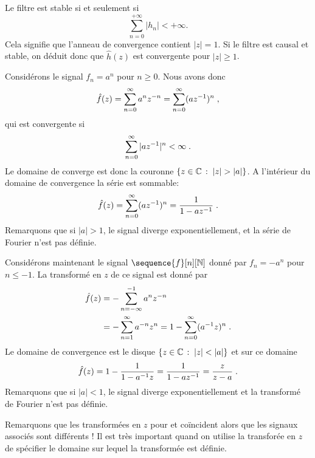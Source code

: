 Le filtre est stable si et seulement si
\[
\sum_{n=0}^{+\infty} |h_n| < +\infty .
\]
Cela signifie que l'anneau de convergence contient $|z| = 1$.
Si le filtre est causal et stable, on d\'eduit donc que
$\hat h(z)$ est convergente pour $|z| \geq 1$.
\begin{example}
\label{exam:exponential-1}
Consid\'erons le signal $f_n= a^n$ pour $n \geq 0$. Nous avons donc
\[
\hat{f}(z) = \sum_{n=0}^\infty a^n z^{-n} = \sum_{n=0}^{\infty} (a z^{-1})^n \;,
\]
qui est convergente si 
\[
\sum_{n=0}^{\infty} |a z^{-1}|^n < \infty \;.
\]
Le domaine de converge est donc la couronne $\left\{z \in \mathbb{C}\,:\; |z| > |a|\right\}$. A l'int\'erieur du domaine de convergence la série est sommable:
\[
\hat{f}(z)= \sum_{n=0}^\infty (a z^{-1})^n = \frac{1}{1 - a z^{-1}} \;.
\]
Remarquons que si $|a| > 1$, le signal diverge exponentiellement, et la s\'erie de Fourier n'est pas d\'efinie.
\end{example}
\begin{example}
\label{exam:exponential-2}
Consid\'erons maintenant le signal $\sequence{f}[n][\nset]$ donn\'e par $f_n = - a^n$ pour $n \leq -1$. La transform\'e en $z$ de ce signal est donn\'e par 
\begin{align*}
\hat{f}(z)
&= - \sum_{n=-\infty}^{-1} a^n z^{-n} \\ 
&= - \sum_{n=1}^\infty a^{-n} z^n = 1 - \sum_{n=0}^\infty (a^{-1} z)^n \;.
\end{align*}
Le domaine de convergence est le disque $\left\{z \in \mathbb{C}\,:\; |z| < |a|\right\}$ et sur ce domaine 
\[
\hat{f}(z)= 1 - \frac{1}{1-a^{-1} z}= \frac{1}{1-a z^{-1}}= \frac{z}{z-a} \;.
\]
Remarquons que si $|a| < 1$, le signal diverge exponentiellement et la transform\'e de Fourier n'est pas d\'efinie.
\end{example}
Remarquons que les transformées en $z$ pour  et  co\"incident alors que les signaux associ\'es sont diff\'erents ! Il est tr\`es important quand on utilise la transfor\'ee en $z$ de sp\'ecifier le domaine sur lequel la transform\'ee est d\'efinie.


